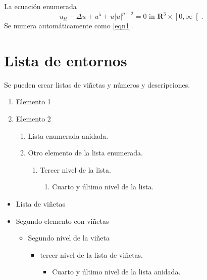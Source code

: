 \documentclass[11pt,spanish]{report}
\begin{document}
La ecuación enumerada
\begin{equation}
u_{tt}-\Delta u+u^{5}+u\left|  u\right|  ^{p-2}=0\text{ in }\mathbf{R}
^{3}\times\left[  0,\infty\right[  .\label{eqn1}
\end{equation}
Se numera automáticamente como \ref{eqn1}.

\section{Lista de entornos}

Se pueden crear listas de viñetas y números y descripciones.

\begin{enumerate}
\item Elemento 1

\item Elemento 2

\begin{enumerate}
\item Lista enumerada anidada.

\item Otro elemento de la lista enumerada.

\begin{enumerate}
\item Tercer nivel de la lista.

\begin{enumerate}
\item Cuarto y último nivel de la lista.
\end{enumerate}
\end{enumerate}
\end{enumerate}
\end{enumerate}

\begin{itemize}
\item Lista de viñetas

\item Segundo elemento con viñetas

\begin{itemize}
\item Segundo nivel de la viñeta

\begin{itemize}
\item tercer nivel de la lista de viñetas.

\begin{itemize}
\item Cuarto y último nivel de la lista anidada.
\end{itemize}
\end{itemize}
\end{itemize}
\end{itemize}
\end{document}

